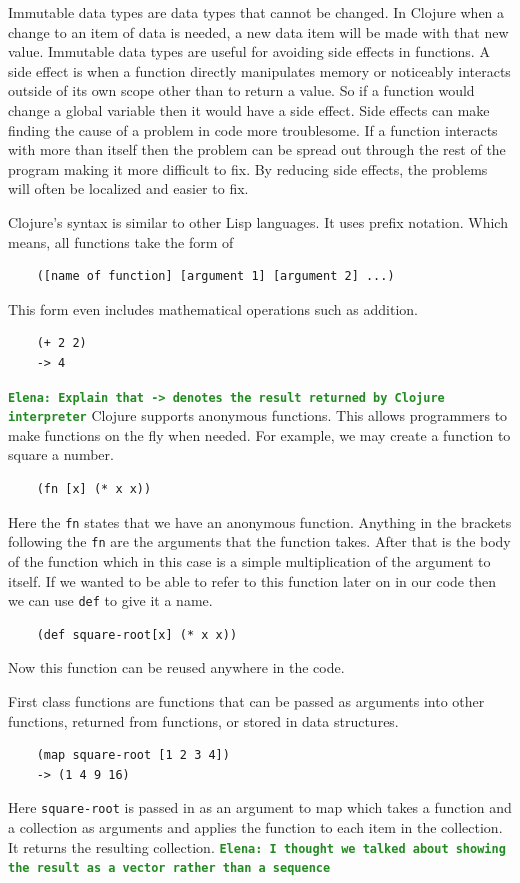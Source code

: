 \documentclass[12pt]{article}
\newcommand{\comment}[1]{{\bf \tt  {#1}}}
\newcommand{\emcomment}[1]{\textcolor{ForestGreen}{\comment{Elena: {#1}}}}
\begin{document}
Immutable data types are data types that cannot be changed. In Clojure when a change to an item of data is needed, a new data item will be made with that new value. Immutable data types are useful for avoiding side effects in functions. A side effect is when a function directly manipulates memory or noticeably interacts outside of its own scope other than to return a value. So if a function would change a global variable then it would have a side effect. Side effects can make finding the cause of a problem in code more troublesome. If a function interacts with more than itself then the problem can be spread out through the rest of the program making it more difficult to fix. By reducing side effects, the problems will often be localized and easier to fix. 

Clojure's syntax is similar to other Lisp languages. It uses prefix notation. Which means, all functions take the form of
\begin{verbatim}
	([name of function] [argument 1] [argument 2] ...)
\end{verbatim}
This form even includes mathematical operations such as addition.
\begin{verbatim}
	(+ 2 2)
	-> 4
\end{verbatim}
\emcomment{Explain that -> denotes the result returned by Clojure interpreter}
Clojure supports anonymous functions. This allows programmers to make functions on the fly when needed. For example, we may create a function to square a number.
\begin{verbatim}
	(fn [x] (* x x))
\end{verbatim}
Here the \texttt{fn} states that we have an anonymous function. Anything in the brackets following the \texttt{fn} are the arguments that the function takes. After that is the body of the  function which in this case is a simple multiplication of the argument to itself. If we wanted to be able to refer to this function later on in our code then we can use \texttt{def} to give it a name.
\begin{verbatim}
	(def square-root[x] (* x x))
\end{verbatim}
Now this function can be reused anywhere in the code.

First class functions are functions that can be passed as arguments into other functions, returned from functions, or stored in data structures.
\begin{verbatim}
	(map square-root [1 2 3 4])
	-> (1 4 9 16)
\end{verbatim}
Here \texttt{square-root} is passed in as an argument to map which takes a function and a collection as arguments and applies the function to each item in the collection. It returns the resulting collection.   \emcomment{I thought we talked about showing the result as a vector rather than a sequence} 
\end{document}
